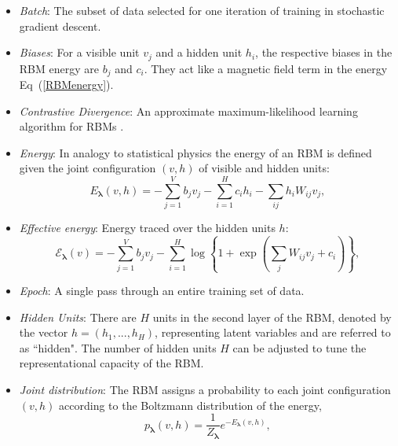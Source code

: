 \documentclass[submission, Phys]{SciPost}
\begin{document}
\begin{itemize}

\item {\it Batch}:  The subset of data selected for one iteration of training in stochastic gradient descent.

\item {\it Biases}:  For a visible unit $v_j$ and a hidden unit $h_i$, the respective biases in the RBM energy are $b_j$ and $c_i$. They act like a magnetic field term in the energy Eq~(\ref{RBMenergy}).

\item {\it Contrastive Divergence}:  An approximate maximum-likelihood learning algorithm for RBMs \cite{hinton2002training}.

\item {\it Energy}:  In analogy to statistical physics the energy of an RBM is defined given the joint configuration $(v,h)$ of visible and hidden units:
\begin{equation}
E_{\bm{\lambda}}(v,h) = - \sum\limits_{j=1}^V b_j v_j - \sum\limits_{i=1}^H c_i h_i - \sum\limits_{ij} h_i W_{ij} v_j, \label{RBMenergy} 
\end{equation}

\item {\it Effective energy}:  Energy traced over the hidden units $h$:
\begin{equation}
\mathcal{E}_{\bm{\lambda}}(v) = - \sum\limits_{j=1}^V b_j v_j - \sum\limits_{i=1}^H \log \left\{ 1 + \exp \left( \sum\limits_{j} W_{ij}v_j +c_i\right) \right\}, \label{RBMeffectiveenergy} 
\end{equation}

\item {\it Epoch}:  A single pass through an entire training set of data.

\item {\it Hidden Units}:  There are $H$ units in the second layer of the RBM, denoted by the vector $h=(h_1, ..., h_H)$, representing latent variables and are referred to as ``hidden".  The number of hidden units $H$ can be adjusted to tune the representational capacity of the RBM.

\item {\it Joint distribution}:  The RBM assigns a probability to each joint configuration $(v,h)$ according to the Boltzmann distribution of the energy,
\begin{equation}
    p_{\bm{\lambda}}(v,h) = \frac{1}{Z_{\bm{\lambda}}} e^{-E_{\bm{\lambda}}(v,h)},
\end{equation}


\end{itemize}
\end{document}
